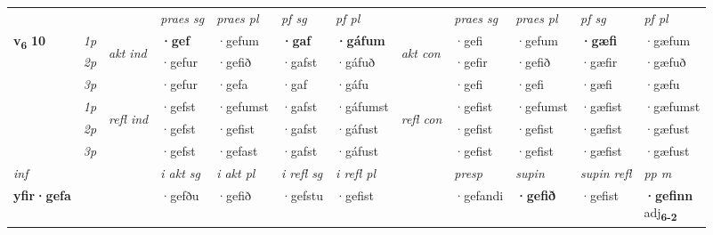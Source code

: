 \begin{longtable}[l]{X>{\footnotesize\itshape}llXXXXlXXXX}
 & &   & \textit{praes sg}  & \textit{praes pl}    & \textit{ pf sg} & \textit{pf pl} & & \textit{praes sg}  & \textit{praes pl}    & \textit{pf sg} & \textit{pf pl }  \\ \cmidrule{4-7} \cmidrule{9-12}
 \multirow{2}{*}{{{\textbf{v{\textsubscript{6}}} \Large{\textbf{10}}}}}  & 1p & \multirow{3}{*}{\begin{turn}{90}\textit{akt ind}\end{turn}} & \textbf{·gef} & ·gefum & \textbf{·gaf} & \textbf{·gáfum} & \multirow{3}{*}{\begin{turn}{90}\textit{akt con}\end{turn}} &·gefi & ·gefum & \textbf{·gæfi} & ·gæfum\\*
 & 2p &  &  ·gefur  & ·gefið & ·gafst & ·gáfuð & & ·gefir & ·gefið & ·gæfir & ·gæfuð \\*
 & 3p &  & ·gefur & ·gefa & ·gaf & ·gáfu & & ·gefi & ·gefi& ·gæfi & ·gæfu \\*
\cmidrule{4-7} \cmidrule{9-12}
 & 1p & \multirow{3}{*}{\begin{turn}{90}\textit{refl ind}\end{turn}}  & ·gefst & ·gefumst & ·gafst & ·gáfumst & \multirow{3}{*}{\begin{turn}{90}\textit{refl con}\end{turn}}  &·gefist & ·gefumst & ·gæfist & ·gæfumst \\*
 & 2p &  & ·gefst & ·gefist & ·gafst & ·gáfust & &·gefist & ·gefist & ·gæfist & ·gæfust \\*
 & 3p  & & ·gefst & ·gefast & ·gafst & ·gáfust & & ·gefist & ·gefist& ·gæfist & ·gæfust \\*
\cmidrule{4-7} \cmidrule{9-12}

   {\textit{inf}} & &  & \textit{i akt sg} & \textit{i akt pl} & \textit{i refl sg} & \textit{i refl pl} && \textit{presp} & \textit{supin} & \textit{supin refl} & \textit{pp m} \\*
  {\textbf{yfir\allowbreak ·gefa}} & && ·gefðu  & ·gefið & ·gefstu & ·gefist && ·gefandi &  \textbf{·gefið} & ·gefist & \specialcell{\textbf{·gefinn} \\ adj\textbf{\textsubscript{6-2}}} \\*

\midrule


\end{longtable}
